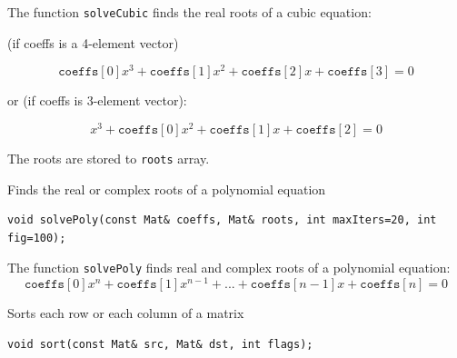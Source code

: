 The function \texttt{solveCubic} finds the real roots of a cubic equation:

(if coeffs is a 4-element vector)

\[
\texttt{coeffs}[0] x^3 + \texttt{coeffs}[1] x^2 + \texttt{coeffs}[2] x + \texttt{coeffs}[3] = 0
\]

or (if coeffs is 3-element vector):

\[
x^3 + \texttt{coeffs}[0] x^2 + \texttt{coeffs}[1] x + \texttt{coeffs}[2] = 0
\]

The roots are stored to \texttt{roots} array.

\label{solvePoly}
Finds the real or complex roots of a polynomial equation

\begin{lstlisting}
void solvePoly(const Mat& coeffs, Mat& roots, int maxIters=20, int fig=100);
\end{lstlisting}
\begin{description}
\end{description}

The function \texttt{solvePoly} finds real and complex roots of a polynomial equation:
\[
\texttt{coeffs}[0] x^{n} + \texttt{coeffs}[1] x^{n-1} + ... + \texttt{coeffs}[n-1] x + \texttt{coeffs}[n] = 0
\]

\label{sort}
Sorts each row or each column of a matrix

\begin{lstlisting}
void sort(const Mat& src, Mat& dst, int flags);
\end{lstlisting}
\begin{description}
\end{description}

